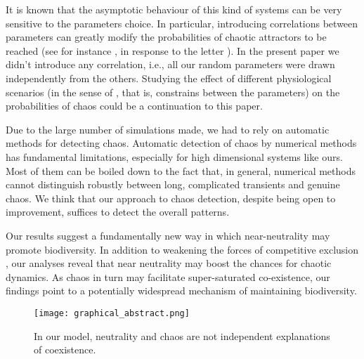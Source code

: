 It is known that the asymptotic behaviour of this kind of systems can be very sensitive to the parameters choice. In particular, introducing correlations between parameters can greatly modify the probabilities of chaotic attractors to be reached (see for instance \cite{Huisman2001}, in response to the letter \cite{Schippers2001}). In the present paper we didn't introduce any correlation, i.e., all our random parameters were drawn independently from the others. Studying the effect of different physiological scenarios (in the sense of \cite{Huisman2001}, that is, constrains between the parameters) on the probabilities of chaos could be a continuation to this paper.

Due to the large number of simulations made, we had to rely on automatic methods for detecting chaos. Automatic detection of chaos by numerical methods has fundamental limitations, especially for high dimensional systems like ours. Most of them can be boiled down to the fact that, in general, numerical methods cannot distinguish robustly between long, complicated transients and genuine chaos. We think that our approach to chaos detection, despite being open to improvement, suffices to detect the overall patterns.

Our results suggest a fundamentally new way in which near-neutrality may promote biodiversity. In addition to weakening the forces of competitive exclusion \cite{Scheffer2018}, our analyses reveal that near neutrality may boost the chances for chaotic dynamics. As chaos in turn may facilitate super-saturated co-existence, our findings point to a potentially widespread mechanism of maintaining biodiversity.

\begin{figure}
	\begin{center}
		\texttt{[image: graphical\_abstract.png]}
	\end{center}
	\caption{In our model, neutrality and chaos are not independent explanations of coexistence.}
	\label{fig:GapInKnowledge}
\end{figure}